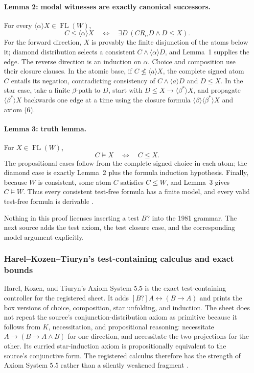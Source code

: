 \paragraph{Lemma 2: modal witnesses are exactly canonical successors.}
For every \(\langle\alpha\rangle X\in\operatorname{FL}(W)\),
\[
 C\leq\langle\alpha\rangle X
 \quad\Longleftrightarrow\quad
 \exists D\,(C R_\alpha D\land D\leq X).
\]
For the forward direction, \(X\) is provably the finite disjunction of the atoms
below it; diamond distribution selects a consistent
\(C\land\langle\alpha\rangle D\), and Lemma~1 supplies the edge.  The reverse
direction is an induction on \(\alpha\).  Choice and composition use their
closure clauses.  In the atomic base, if \(C\not\leq\langle a\rangle X\), the
complete signed atom \(C\) entails its negation, contradicting consistency of
\(C\land\langle a\rangle D\) and \(D\leq X\).  In the star case, take a
finite \(\beta\)-path to \(D\), start
with \(D\leq X\to\langle\beta^{*}\rangle X\), and propagate
\(\langle\beta^{*}\rangle X\) backwards one edge at a time using the closure
formula \(\langle\beta\rangle\langle\beta^{*}\rangle X\) and axiom (6).

\paragraph{Lemma 3: truth lemma.}
For \(X\in\operatorname{FL}(W)\),
\[
 C\models X\quad\Longleftrightarrow\quad C\leq X.
\]
The propositional cases follow from the complete signed choice in each atom;
the diamond case is exactly Lemma~2 plus the formula induction hypothesis.
Finally, because \(W\) is consistent, some atom \(C\) satisfies \(C\leq W\),
and Lemma~3 gives \(C\models W\).  Thus every consistent test-free formula has
a finite model, and every valid test-free formula is derivable
\cite[pp.~114--118]{KozenParikh1981}.

Nothing in this proof licenses inserting a test \(B?\) into the 1981 grammar.
The next source adds the test axiom, the test closure case, and the corresponding
model argument explicitly.

\subsubsection{Harel--Kozen--Tiuryn's test-containing calculus and exact bounds}

Harel, Kozen, and Tiuryn's Axiom System 5.5 is the exact test-containing
controller for the registered sheet.  It adds
\([B?]A\leftrightarrow(B\to A)\) and prints the box versions of choice,
composition, star unfolding, and induction.  The sheet does not repeat the
source's conjunction-distribution axiom as primitive because it follows from
\(K\), necessitation, and propositional reasoning: necessitate
\(A\to(B\to A\land B)\) for one direction, and necessitate the two projections
for the other.  Its curried star-induction axiom is propositionally equivalent
to the source's conjunctive form.  The registered calculus therefore has the
strength of Axiom System 5.5 rather than a silently weakened fragment
\cite[\S5.5]{HarelKozenTiuryn2000}.

